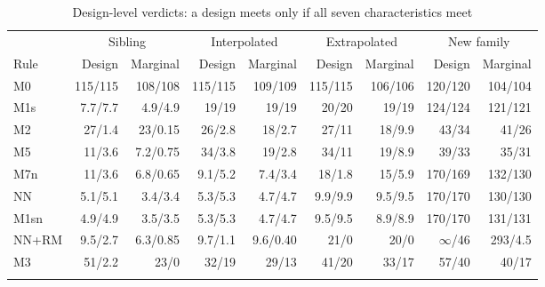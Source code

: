 \documentclass[pdflatex,sn-basic]{sn-jnl}
\newcommand{\tabsizesmall}{\footnotesize}
\begin{document}
\begin{table}[p]
\tabsizesmall
\setlength{\tabcolsep}{2.4pt}
\caption{Design-level verdicts: a design meets only if all seven characteristics meet}\label{tab:s-design}
\begin{tabular}{@{}lrrrrrrrr@{}}
\toprule
 & \multicolumn{2}{c}{Sibling} & \multicolumn{2}{c}{Interpolated} & \multicolumn{2}{c}{Extrapolated} & \multicolumn{2}{c}{New family} \\
\cmidrule(lr){2-3}\cmidrule(lr){4-5}\cmidrule(lr){6-7}\cmidrule(lr){8-9}
Rule & Design & Marginal & Design & Marginal & Design & Marginal & Design & Marginal \\
\midrule
M0 & 115/115 & 108/108 & 115/115 & 109/109 & 115/115 & 106/106 & 120/120 & 104/104 \\
M1s & 7.7/7.7 & 4.9/4.9 & 19/19 & 19/19 & 20/20 & 19/19 & 124/124 & 121/121 \\
M2 & 27/1.4 & 23/0.15 & 26/2.8 & 18/2.7 & 27/11 & 18/9.9 & 43/34 & 41/26 \\
M5 & 11/3.6 & 7.2/0.75 & 34/3.8 & 19/2.8 & 34/11 & 19/8.9 & 39/33 & 35/31 \\
M7n & 11/3.6 & 6.8/0.65 & 9.1/5.2 & 7.4/3.4 & 18/1.8 & 15/5.9 & 170/169 & 132/130 \\
NN & 5.1/5.1 & 3.4/3.4 & 5.3/5.3 & 4.7/4.7 & 9.9/9.9 & 9.5/9.5 & 170/170 & 130/130 \\
M1sn & 4.9/4.9 & 3.5/3.5 & 5.3/5.3 & 4.7/4.7 & 9.5/9.5 & 8.9/8.9 & 170/170 & 131/131 \\
NN+RM & 9.5/2.7 & 6.3/0.85 & 9.7/1.1 & 9.6/0.40 & 21/0 & 20/0 & $\infty$/46 & 293/4.5 \\
M3 & 51/2.2 & 23/0 & 32/19 & 29/13 & 41/20 & 33/17 & 57/40 & 40/17 \\
\botrule
\end{tabular}
\end{table}
\end{document}
